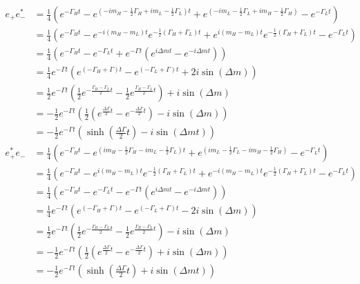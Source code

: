 \begin{align}
    e_+e_-^* &=\frac{1}{4}\left(e^{-\Gamma_Ht}-e^{\left(-im_H-\frac{1}{2}\Gamma_H+im_L-\frac{1}{2}\Gamma_L\right)t}
    +e^{\left(-im_L-\frac{1}{2}\Gamma_L+im_H-\frac{1}{2}\Gamma_H\right)}-e^{-\Gamma_Lt}\right)\nonumber\\
    &= \frac{1}{4}\left(e^{-\Gamma_Ht}-e^{-i\left(m_H-m_L\right)t}e^{-\frac{1}{2}\left(\Gamma_H+\Gamma_L\right)t}
    +e^{i\left(m_H-m_L\right)t}e^{-\frac{1}{2}\left(\Gamma_H+\Gamma_L\right)t}-e^{-\Gamma_Lt}\right)\nonumber\\
    &=\frac{1}{4}\left(e^{-\Gamma_Ht}-e^{-\Gamma_Lt}+e^{-\Gamma t}\left(e^{i\Delta mt}-e^{-i\Delta mt}\right)\right)\nonumber\\
    &=\frac{1}{4}e^{-\Gamma t}\left(e^{\left(-\Gamma_H+\Gamma\right)t} - e^{\left(-\Gamma_L+\Gamma\right)t} + 2i\sin\left(\Delta m\right)\right)\nonumber\\
    &=\frac{1}{2}e^{-\Gamma t}\left(\frac{1}{2}e^{-\frac{\Gamma_H-\Gamma_L}{2}t} - \frac{1}{2}e^{\frac{\Gamma_H-\Gamma_L}{2}t}\right)
    +i\sin\left(\Delta m\right)\nonumber\\
    &= -\frac{1}{2}e^{-\Gamma t}\left(\frac{1}{2}\left(e^{\frac{\Delta\Gamma}{2}t} - e^{-\frac{\Delta\Gamma}{2}t}\right)
    -i\sin\left(\Delta m\right)\right)\nonumber\\
    &= -\frac{1}{2}e^{-\Gamma t}\left(\sinh\left(\frac{\Delta\Gamma}{2}t\right)-i\sin\left(\Delta m t\right)\right)\label{eq:first_calculation}\\
    e_+^*e_- &=\frac{1}{4}\left(e^{-\Gamma_Ht}-e^{\left(im_H-\frac{1}{2}\Gamma_H-im_L-\frac{1}{2}\Gamma_L\right)t}
    +e^{\left(im_L-\frac{1}{2}\Gamma_L-im_H-\frac{1}{2}\Gamma_H\right)}-e^{-\Gamma_Lt}\right)\nonumber\\
    &= \frac{1}{4}\left(e^{-\Gamma_Ht}-e^{i\left(m_H-m_L\right)t}e^{-\frac{1}{2}\left(\Gamma_H+\Gamma_L\right)t}
    +e^{-i\left(m_H-m_L\right)t}e^{-\frac{1}{2}\left(\Gamma_H+\Gamma_L\right)t}-e^{-\Gamma_Lt}\right)\nonumber\\
    &=\frac{1}{4}\left(e^{-\Gamma_Ht}-e^{-\Gamma_Lt}-e^{-\Gamma t}\left(e^{i\Delta mt}-e^{-i\Delta mt}\right)\right)\nonumber\\
    &=\frac{1}{4}e^{-\Gamma t}\left(e^{\left(-\Gamma_H+\Gamma\right)t} - e^{\left(-\Gamma_L+\Gamma\right)t} - 2i\sin\left(\Delta m\right)\right)\nonumber\\
    &=\frac{1}{2}e^{-\Gamma t}\left(\frac{1}{2}e^{-\frac{\Gamma_H-\Gamma_L}{2}t} - \frac{1}{2}e^{\frac{\Gamma_H-\Gamma_L}{2}t}\right)
    -i\sin\left(\Delta m\right)\nonumber\\
    &= -\frac{1}{2}e^{-\Gamma t}\left(\frac{1}{2}\left(e^{\frac{\Delta\Gamma}{2}t} - e^{-\frac{\Delta\Gamma}{2}t}\right)
    +i\sin\left(\Delta m\right)\right)\nonumber\\
    &= -\frac{1}{2}e^{-\Gamma t}\left(\sinh\left(\frac{\Delta\Gamma}{2}t\right)+i\sin\left(\Delta m t\right)\right)\label{eq:second_calculation}
\end{align}
